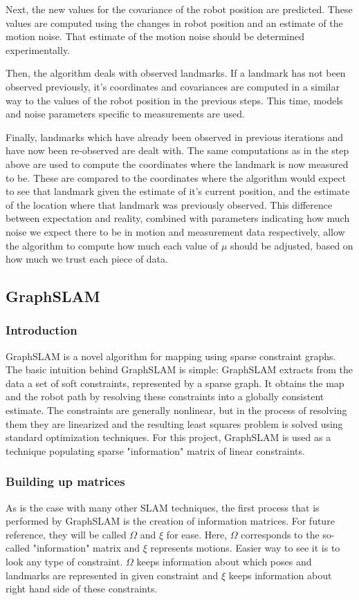 \documentclass{ba-kecs}
\numberwithin{figure}{section}
\numberwithin{equation}{section}
\begin{document}
Next, the new values for the covariance of the robot position are predicted. These values are computed using the changes in robot position and an estimate of the motion noise. That estimate of the motion noise should be determined experimentally.

Then, the algorithm deals with observed landmarks. If a landmark has not been observed previously, it’s coordinates and covariances are computed in a similar way to the values of the robot position in the previous steps. This time, models and noise parameters specific to measurements are used.

Finally, landmarks which have already been observed in previous iterations and have now been re-observed are dealt with. The same computations as in the step above are used to compute the coordinates where the landmark is now measured to be. These are compared to the coordinates where the algorithm would expect to see that landmark given the estimate of it’s current position, and the estimate of the location where that landmark was previously observed. This difference between expectation and reality, combined with parameters indicating how much noise we expect there to be in motion and measurement data respectively, allow the algorithm to compute how much each value of $\mu$ should be adjusted, based on how much we trust each piece of data.

\subsection{GraphSLAM}

\subsubsection{Introduction}
GraphSLAM is a novel algorithm for mapping using sparse constraint graphs. The basic intuition behind GraphSLAM is simple: GraphSLAM extracts from the data a set of soft constraints, represented by a sparse graph. It obtains the map and the robot path by resolving these constraints into a globally consistent estimate. The constraints are generally nonlinear, but in the process of resolving them they are linearized and the resulting least squares problem is solved using standard optimization techniques\cite{sik}. For this project, GraphSLAM is used as a technique populating sparse "information" matrix of linear constraints.

\subsubsection{Building up matrices}
As is the case with many other SLAM techniques, the first process that is performed by GraphSLAM is the creation of information matrices. For future reference, they will be called $\Omega$ and $\xi$ for ease. Here, $\Omega$ corresponds to the so-called "information" matrix and $\xi$ represents motions. Easier way to see it is to look any type of constraint. $\Omega$ keeps information about which poses and landmarks are represented in given constraint and $\xi$ keeps information about right hand side of these constraints.
	
\end{document}
